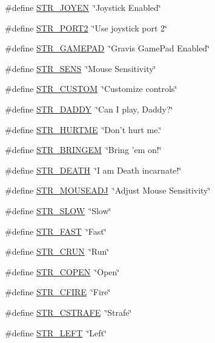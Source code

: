 \begin{DoxyCompactItemize}
\#define \hyperlink{FOREIGN_8H_a9a355ec99e759fcbc938a6db0cecb01c}{STR\_\-JOYEN}~\char`\"{}Joystick Enabled\char`\"{}
\item 
\#define \hyperlink{FOREIGN_8H_a452ce4b896d1cf6206cf60af703eefce}{STR\_\-PORT2}~\char`\"{}Use joystick port 2\char`\"{}
\item 
\#define \hyperlink{FOREIGN_8H_a5e81b41eeda9b4b2ae32fc9957fb0dd4}{STR\_\-GAMEPAD}~\char`\"{}Gravis GamePad Enabled\char`\"{}
\item 
\#define \hyperlink{FOREIGN_8H_a571a8f88c4f7f91f33faa7717eb2353b}{STR\_\-SENS}~\char`\"{}Mouse Sensitivity\char`\"{}
\item 
\#define \hyperlink{FOREIGN_8H_a1e1030901163a82f9f294e72b36a6f75}{STR\_\-CUSTOM}~\char`\"{}Customize controls\char`\"{}
\item 
\#define \hyperlink{FOREIGN_8H_af89da5a70620dd2033cdd060d3a7484d}{STR\_\-DADDY}~\char`\"{}Can I play, Daddy?\char`\"{}
\item 
\#define \hyperlink{FOREIGN_8H_a9a26d5add11d8d720f18048f0bc7f38c}{STR\_\-HURTME}~\char`\"{}Don't hurt me.\char`\"{}
\item 
\#define \hyperlink{FOREIGN_8H_ad016869b8e988020793c6648820cb7b2}{STR\_\-BRINGEM}~\char`\"{}Bring 'em on!\char`\"{}
\item 
\#define \hyperlink{FOREIGN_8H_a893348627a5f38f91d88352dc9e28ea4}{STR\_\-DEATH}~\char`\"{}I am Death incarnate!\char`\"{}
\item 
\#define \hyperlink{FOREIGN_8H_a24089f18d52979d101c27f9a76f17758}{STR\_\-MOUSEADJ}~\char`\"{}Adjust Mouse Sensitivity\char`\"{}
\item 
\#define \hyperlink{FOREIGN_8H_a24b7da281a7f47f3f2c7339fb7c89a89}{STR\_\-SLOW}~\char`\"{}Slow\char`\"{}
\item 
\#define \hyperlink{FOREIGN_8H_abd3a232c8bbf73ee500f7ce9ee855b2f}{STR\_\-FAST}~\char`\"{}Fast\char`\"{}
\item 
\#define \hyperlink{FOREIGN_8H_a2c216c6320a281ef26a1be4db3f62ec2}{STR\_\-CRUN}~\char`\"{}Run\char`\"{}
\item 
\#define \hyperlink{FOREIGN_8H_a19f9c1096494183513c9856732ee45b3}{STR\_\-COPEN}~\char`\"{}Open\char`\"{}
\item 
\#define \hyperlink{FOREIGN_8H_aa2c585b9e1da9f146cac7af9e5981d09}{STR\_\-CFIRE}~\char`\"{}Fire\char`\"{}
\item 
\#define \hyperlink{FOREIGN_8H_a40aa9ac83689de6bdf9331bc7486b170}{STR\_\-CSTRAFE}~\char`\"{}Strafe\char`\"{}
\item 
\#define \hyperlink{FOREIGN_8H_a275bf4a945109f750effc30403a72895}{STR\_\-LEFT}~\char`\"{}Left\char`\"{}

\end{DoxyCompactItemize}
